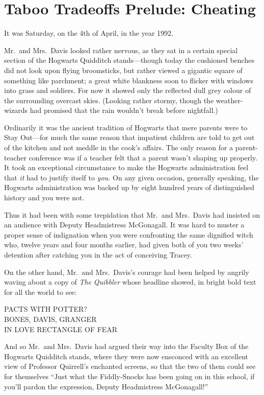\chapter{Taboo Tradeoffs Prelude: Cheating}

It was Saturday, on the 4th of April, in the year 1992.

Mr.~and Mrs.~Davis looked rather nervous, as they sat in a certain
special section of the Hogwarts Quidditch stands---though today the
cushioned benches did not look upon flying broomsticks, but rather
viewed a gigantic square of something like parchment; a great white
blankness soon to flicker with windows into grass and soldiers. For now
it showed only the reflected dull grey colour of the surrounding
overcast skies. (Looking rather stormy, though the weather-wizards had
promised that the rain wouldn't break before nightfall.)

Ordinarily it was the ancient tradition of Hogwarts that mere parents
were to Stay Out---for much the same reason that impatient children are
told to get out of the kitchen and not meddle in the cook's affairs. The
only reason for a parent-teacher conference was if a teacher felt that a
parent wasn't shaping up properly. It took an exceptional circumstance
to make the Hogwarts administration feel that \emph{it} had to justify
itself to \emph{you.} On any given occasion, generally speaking, the
Hogwarts administration was backed up by eight hundred years of
distinguished history and you were not.

Thus it had been with some trepidation that Mr.~and Mrs.~Davis had
insisted on an audience with Deputy Headmistress McGonagall. It was hard
to muster a proper sense of indignation when you were confronting the
same dignified witch who, twelve years and four months earlier, had
given both of you two weeks' detention after catching you in the act of
conceiving Tracey.

On the other hand, Mr.~and Mrs.~Davis's courage had been helped by
angrily waving about a copy of \emph{The} \emph{Quibbler} whose headline
showed, in bright bold text for all the world to see:

PACTS WITH POTTER?\\BONES, DAVIS, GRANGER\\IN LOVE RECTANGLE OF FEAR

And so Mr.~and Mrs.~Davis had argued their way into the Faculty Box of
the Hogwarts Quidditch stands, where they were now ensconced with an
excellent view of Professor Quirrell's enchanted screens, so that the
two of them could see for themselves ``Just what the Fiddly-Snocks has
been going on in this school, if you'll pardon the expression, Deputy
Headmistress McGonagall!''

